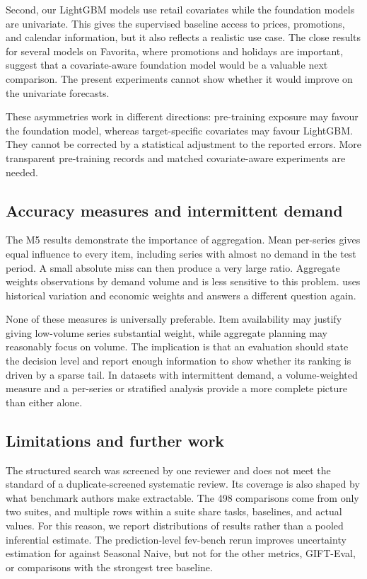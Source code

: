 Second, our LightGBM models use retail covariates while the foundation models
are univariate. This gives the supervised baseline access to prices,
promotions, and calendar information, but it also reflects a realistic use
case. The close results for several models on Favorita, where promotions and
holidays are important, suggest that a covariate-aware foundation model would
be a valuable next comparison. The present experiments cannot show whether it
would improve on the univariate forecasts.

These asymmetries work in different directions: pre-training exposure may
favour the foundation model, whereas target-specific covariates may favour
LightGBM. They cannot be corrected by a statistical adjustment to the
reported errors. More transparent pre-training records and matched
covariate-aware experiments are needed.

\subsection{Accuracy measures and intermittent demand}
\label{subsec:perseries-vs-aggregate}

The M5 results demonstrate the importance of aggregation. Mean per-series
\WAPE{} gives equal influence to every item, including series with almost no
demand in the test period. A small absolute miss can then produce a very large
ratio. Aggregate \WAPE{} weights observations by demand volume and is less
sensitive to this problem. \WRMSSE{} uses historical variation and economic
weights and answers a different question again.

None of these measures is universally preferable. Item availability may
justify giving low-volume series substantial weight, while aggregate planning
may reasonably focus on volume. The implication is that an evaluation should
state the decision level and report enough information to show whether its
ranking is driven by a sparse tail. In datasets with intermittent demand, a
volume-weighted measure and a per-series or stratified analysis provide a more
complete picture than either alone.

\subsection{Limitations and further work}
\label{subsec:limitations}\label{sec:limitations}

The structured search was screened by one reviewer and does not meet the
standard of a duplicate-screened systematic review. Its coverage is also
shaped by what benchmark authors make extractable. The 498 comparisons come
from only two suites, and multiple rows within a suite share tasks, baselines,
and actual values. For this reason, we report distributions of results rather
than a pooled inferential estimate. The prediction-level fev-bench rerun
improves uncertainty estimation for \WAPE{} against Seasonal Naive, but not
for the other metrics, GIFT-Eval, or comparisons with the strongest tree
baseline.

